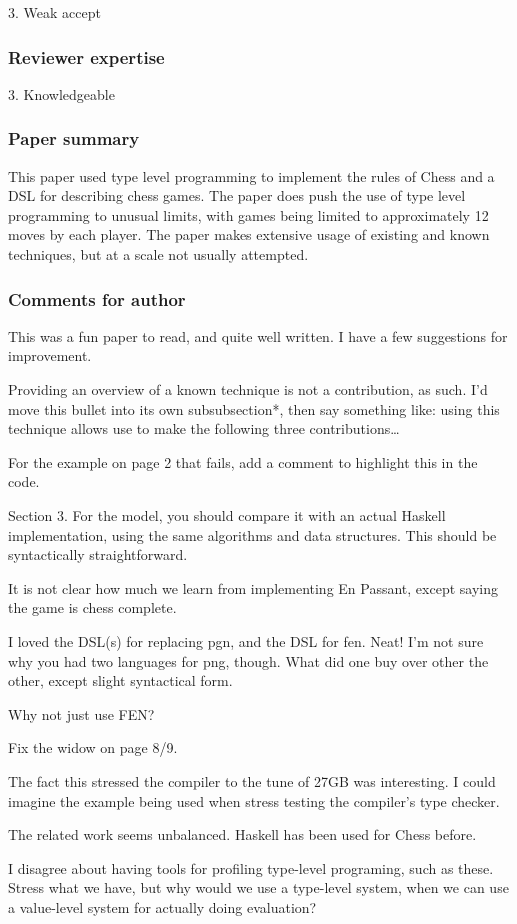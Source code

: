 3. Weak accept

\subsubsection*{Reviewer expertise}

3. Knowledgeable

\subsubsection*{Paper summary}

This paper used type level programming to implement the rules of Chess and a DSL for describing chess games. The paper does push the use of type level programming to unusual limits, with games being limited to approximately 12 moves by each player. The paper makes extensive usage of existing and known techniques, but at a scale not usually attempted.

\subsubsection*{Comments for author}

This was a fun paper to read, and quite well written. I have a few suggestions for improvement.

Providing an overview of a known technique is not a contribution, as such. I'd move this bullet into its own subsubsection*, then say something like: using this technique allows use to make the following three contributions…

For the example on page 2 that fails, add a comment to highlight this in the code.

Section 3. For the model, you should compare it with an actual Haskell implementation, using the same algorithms and data structures. This should be syntactically straightforward.

It is not clear how much we learn from implementing En Passant, except saying the game is chess complete.

I loved the DSL(s) for replacing pgn, and the DSL for fen. Neat! I'm not sure why you had two languages for png, though. What did one buy over other the other, except slight syntactical form.

Why not just use FEN?

Fix the widow on page 8/9.

The fact this stressed the compiler to the tune of 27GB was interesting. I could imagine the example being used when stress testing the compiler's type checker.

The related work seems unbalanced. Haskell has been used for Chess before.

I disagree about having tools for profiling type-level programing, such as these. Stress what we have, but why would we use a type-level system, when we can use a value-level system for actually doing evaluation?

